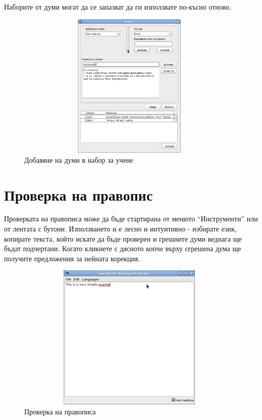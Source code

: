 Наборите от думи могат да се запазват да ги използвате по-късно
отново.

\begin{figure}[htbp]
  \caption{Добавяне на думи в набор за учене}
  \centering
  \includegraphics[width=110mm, height=70mm]{images/add_to_study_set.png}
\end{figure}

\section{Проверка на правопис}
Проверката на правописа може да бъде стартирана от менюто
"`Инструменти"' или от лентата с бутони. Използването и е лесно и
интуитивно - избирате език, копирате текста, който искате да бъде
проверен и грешните думи веднага ще бъдат подчертани. Когато кликнете
с дясното копче върху сгрешена дума ще получите предложения за нейната
корекция. 

\begin{figure}[htbp]
  \caption{Проверка на правописа}
  \centering
  \includegraphics[width=110mm, height=70mm]{images/spellcheck_frame.png}
\end{figure}

